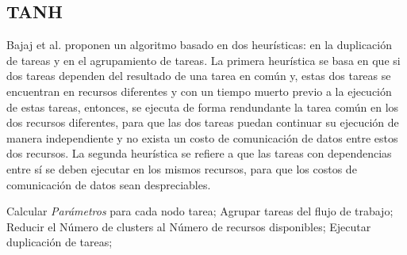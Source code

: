 \subsection{TANH}
\label{alg:tanh}
Bajaj et al. \cite{bajaj2004improving} proponen un algoritmo basado en dos heurísticas: en la duplicación de tareas y en el agrupamiento de tareas. La primera heurística se basa en que si dos tareas dependen del resultado de una tarea en común y, estas dos tareas se encuentran en recursos diferentes y con un tiempo muerto previo a la ejecución de estas tareas, entonces, se ejecuta de forma rendundante la tarea común en los dos recursos diferentes, para que las dos tareas puedan continuar su ejecución de manera independiente y no exista un costo de comunicación de datos entre estos dos recursos. La segunda heurística se refiere a que las tareas con dependencias entre sí se deben ejecutar en los mismos recursos, para que los costos de comunicación de datos sean despreciables.

\begin{algorithmic}[1]
\State Calcular \emph{Parámetros} para cada nodo tarea;
\State Agrupar tareas del flujo de trabajo;
	\State Reducir el Número de clusters al Número de recursos disponibles;
\Else
	\State Ejecutar duplicación de tareas;
\EndIf
\end{algorithmic}



